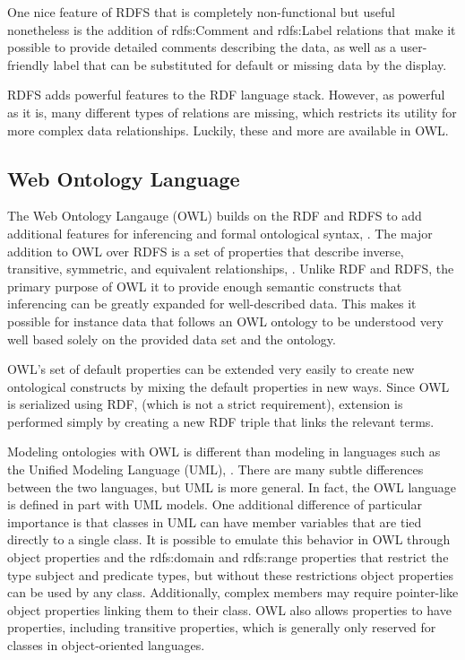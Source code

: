 One nice feature of RDFS that is completely non-functional but useful
nonetheless is the addition of rdfs:Comment and rdfs:Label relations that make
it possible to provide detailed comments describing the data, as well as a
user-friendly label that can be substituted for default or missing data by the
display.

RDFS adds powerful features to the RDF language stack. However, as powerful as
it is, many different types of relations are missing, which restricts its
utility for more complex data relationships. Luckily, these and more are
available in OWL.

\subsection{Web Ontology Language}

The Web Ontology Langauge (OWL) builds on the RDF and RDFS to add additional
features for inferencing and formal ontological syntax, \cite{owl-2}. The major
addition to OWL over RDFS is a set of properties that describe inverse,
transitive, symmetric, and equivalent relationships,
\cite{allemang_semantic_2008}. Unlike RDF and RDFS, the primary purpose of OWL
it to provide enough semantic constructs that inferencing can be greatly
expanded for well-described data. This makes it possible for instance data that
follows an OWL ontology to be understood very well based solely on the provided
data set and the ontology.

OWL's set of default properties can be extended very easily to create new
ontological constructs by mixing the default properties in new ways. Since OWL
is serialized using RDF, (which is not a strict requirement), extension is
performed simply by creating a new RDF triple that links the relevant terms.

Modeling ontologies with OWL is different than modeling in languages such as the
Unified Modeling Language (UML), \cite{UML}. There are many subtle differences
between the two languages, but UML is more general. In fact, the OWL language is
defined in part with UML models. One additional difference of particular
importance is that classes in UML can have member variables that are tied
directly to a single class. It is possible to emulate this behavior in OWL
through object properties and the rdfs:domain and rdfs:range properties that
restrict the type subject and predicate types, but without these restrictions
object properties can be used by any class. Additionally, complex members
may require pointer-like object properties linking them to their class. OWL also
allows properties to have properties, including transitive properties, which is
generally only reserved for classes in object-oriented languages.

